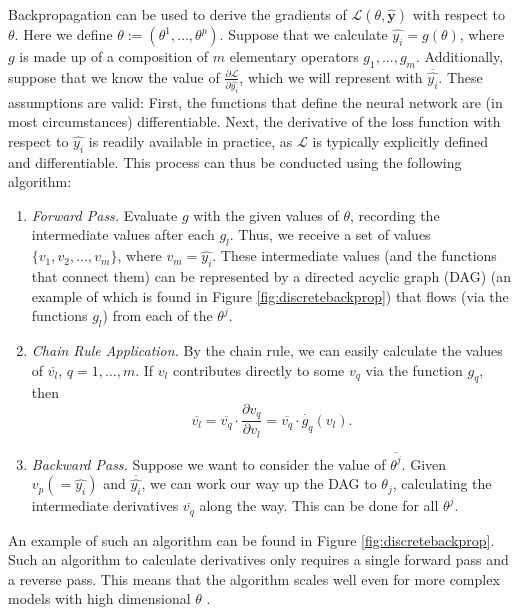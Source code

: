 \documentclass[a4paper,11pt,titlepage]{article}
\theoremstyle{definition}
\theoremstyle{plain}
\theoremstyle{remark}
\begin{document}
Backpropagation can be used to derive the gradients of $\mathcal{L}(\theta, \mathbf{\hat{y}})$ with respect to $\theta$. Here we define $\theta :=  (\theta^1, \dots, \theta^p)$. Suppose that we calculate $\hat{y_i} = g(\theta)$, where $g$ is made up of a composition of $m$ elementary operators $g_1, ..., g_m$. Additionally, suppose that we know the value of $\frac{\partial \mathcal{L}}{\partial \hat{y_i}}$, which we will represent with $\overline{\hat{y_i}}$. These assumptions are valid: First, the functions that define the neural network are (in most circumstances) differentiable. Next, the derivative of the loss function with respect to $\hat{y_i}$ is readily available in practice, as $\mathcal{L}$ is typically explicitly defined and differentiable. This process can thus be conducted using the following algorithm:
\begin{enumerate}
    \item \textit{Forward Pass.} Evaluate $g$ with the given values of $\theta$, recording the intermediate values after each $g_l$. Thus, we receive a set of values $\{v_1, v_2, \dots, v_m \}$, where $v_m = \hat{y_i}$. These intermediate values (and the functions that connect them) can be represented by a directed acyclic graph (DAG) (an example of which is found in Figure \ref{fig:discretebackprop}) that flows (via the functions $g_l$) from each of the $\theta^j$.
    \item \textit{Chain Rule Application.} By the chain rule, we can easily calculate the values of $\overline{v_l}$, $q = 1, \dots, m$. If $v_l$ contributes directly to some $v_{q}$ via the function $g_q$, then
    \begin{equation}
    \overline{v_l} = \overline{v_{q}} \cdot \frac{\partial v_{q}}{\partial v_l} = \overline{v_{q}} \cdot \dot{g_q}(v_l).
    \label{eq:chainrule}
    \end{equation}
    \item \textit{Backward Pass.} Suppose we want to consider the value of $\overline{\theta^j}$. Given $v_p ( = \hat{y_i})$ and $\overline{\hat{y_i}}$, we can work our way up the DAG to $\theta_j$, calculating the intermediate derivatives $\overline{v_q}$ along the way. This can be done for all $\theta^j$.
\end{enumerate}

An example of such an algorithm can be found in Figure \ref{fig:discretebackprop}. Such an algorithm to calculate derivatives only requires a single forward pass and a reverse pass. This means that the algorithm scales well even for more complex models with high dimensional $\theta$ \cite{ketkar2017}.
\end{document}
